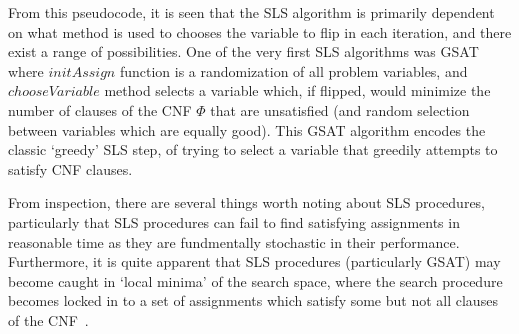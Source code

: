 \documentclass[
10pt, %
a4paper, %
oneside, %
headinclude,footinclude, %
BCOR5mm, %
]{scrartcl}
\begin{document}
From this pseudocode, it is seen that the SLS algorithm is primarily dependent on what method is used to chooses the variable to flip in each iteration, and there exist a range of possibilities.
One of the very first SLS algorithms was GSAT \cite{10.5555/1867135.1867203} where $initAssign$ function is a randomization of all problem variables, and $chooseVariable$ method selects a variable which, if flipped, would minimize the number of clauses of the CNF $\Phi$ that are unsatisfied (and random selection between variables which are equally good).
This GSAT algorithm encodes the classic `greedy' SLS step, of trying to select a variable that greedily attempts to satisfy CNF clauses.

From inspection, there are several things worth noting about SLS procedures, particularly that SLS procedures can fail to find satisfying assignments in reasonable time as they are fundmentally stochastic in their performance.
Furthermore, it is quite apparent that SLS procedures (particularly GSAT) may become caught in `local minima' of the search space, where the search procedure becomes locked in to a set of assignments which satisfy some but not all clauses of the CNF~\cite{journals/jair/GentW93}.
\end{document}

